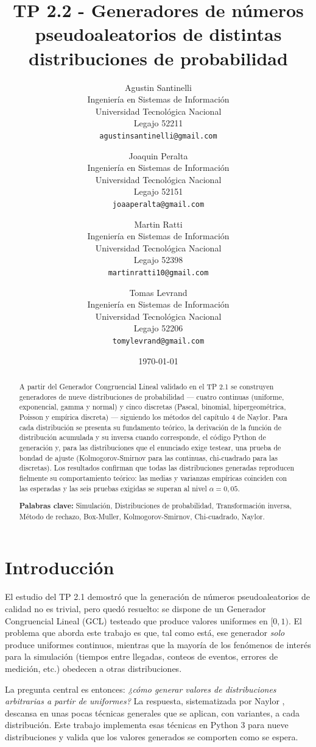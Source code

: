 \documentclass[11pt]{article}
\title{\textbf{TP 2.2 - Generadores de n\'umeros pseudoaleatorios de
distintas distribuciones de probabilidad}}
\author{
  Agustin Santinelli \\
  Ingenier\'ia en Sistemas de Informaci\'on \\
  Universidad Tecnol\'ogica Nacional \\
  Legajo 52211 \\
  \texttt{agustinsantinelli@gmail.com}
  \and
  Joaquin Peralta \\
  Ingenier\'ia en Sistemas de Informaci\'on \\
  Universidad Tecnol\'ogica Nacional \\
  Legajo 52151 \\
  \texttt{joaaperalta@gmail.com}
  \and
  Martin Ratti \\
  Ingenier\'ia en Sistemas de Informaci\'on \\
  Universidad Tecnol\'ogica Nacional \\
  Legajo 52398 \\
  \texttt{martinratti10@gmail.com}
  \and
  Tomas Levrand \\
  Ingenier\'ia en Sistemas de Informaci\'on \\
  Universidad Tecnol\'ogica Nacional \\
  Legajo 52206 \\
  \texttt{tomylevrand@gmail.com}
}
\date{\today}
\begin{document}
\maketitle

\begin{abstract}
\noindent A partir del Generador Congruencial Lineal validado en el TP 2.1
se construyen generadores de nueve distribuciones de probabilidad --- cuatro
continuas (uniforme, exponencial, gamma y normal) y cinco discretas
(Pascal, binomial, hipergeom\'etrica, Poisson y emp\'irica discreta) ---
siguiendo los m\'etodos del cap\'itulo 4 de Naylor. Para cada distribuci\'on
se presenta su fundamento te\'orico, la derivaci\'on de la funci\'on de
distribuci\'on acumulada y su inversa cuando corresponde, el c\'odigo
Python de generaci\'on y, para las distribuciones que el enunciado exige
testear, una prueba de bondad de ajuste (Kolmogorov-Smirnov para las
continuas, chi-cuadrado para las discretas). Los resultados confirman que
todas las distribuciones generadas reproducen fielmente su comportamiento
te\'orico: las medias y varianzas emp\'iricas coinciden con las esperadas
y las seis pruebas exigidas se superan al nivel $\alpha = 0{,}05$.

\vspace{0.5em}
\noindent\textbf{Palabras clave:} Simulaci\'on, Distribuciones de
probabilidad, Transformaci\'on inversa, M\'etodo de rechazo, Box-Muller,
Kolmogorov-Smirnov, Chi-cuadrado, Naylor.
\end{abstract}

\section{Introducci\'on}

El estudio del TP 2.1 demostr\'o que la generaci\'on de n\'umeros
pseudoaleatorios de calidad no es trivial, pero qued\'o resuelto: se
dispone de un Generador Congruencial Lineal (GCL) testeado que produce
valores uniformes en $[0, 1)$. El problema que aborda este trabajo es que,
tal como est\'a, ese generador \emph{solo} produce uniformes continuos,
mientras que la mayor\'ia de los fen\'omenos de inter\'es para la simulaci\'on
(tiempos entre llegadas, conteos de eventos, errores de medici\'on, etc.)
obedecen a otras distribuciones.

La pregunta central es entonces: \emph{¿c\'omo generar valores de
distribuciones arbitrarias a partir de uniformes?} La respuesta, sistematizada
por Naylor \cite{naylor}, descansa en unas pocas t\'ecnicas generales que se
aplican, con variantes, a cada distribuci\'on. Este trabajo implementa esas
t\'ecnicas en Python 3 para nueve distribuciones y valida que los valores
generados se comporten como se espera.
\end{document}
